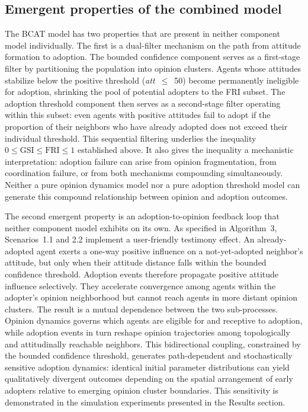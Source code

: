 \documentclass[10pt,letterpaper]{article}
\begin{document}
\subsection*{Emergent properties of the combined model}

The BCAT model has two properties that are present in neither component model individually. The first is a dual-filter mechanism on the path from attitude formation to adoption. The bounded confidence component serves as a first-stage filter by partitioning the population into opinion clusters. Agents whose attitudes stabilize below the positive threshold (\textit{att}~$\leq$~50) become permanently ineligible for adoption, shrinking the pool of potential adopters to the FRI subset. The adoption threshold component then serves as a second-stage filter operating within this subset: even agents with positive attitudes fail to adopt if the proportion of their neighbors who have already adopted does not exceed their individual threshold. This sequential filtering underlies the inequality $0 \leq \text{GSI} \leq \text{FRI} \leq 1$ established above. It also gives the inequality a mechanistic interpretation: adoption failure can arise from opinion fragmentation, from coordination failure, or from both mechanisms compounding simultaneously. Neither a pure opinion dynamics model nor a pure adoption threshold model can generate this compound relationship between opinion and adoption outcomes.

The second emergent property is an adoption-to-opinion feedback loop that neither component model exhibits on its own. As specified in Algorithm~3, Scenarios~1.1 and 2.2 implement a user-friendly testimony effect. An already-adopted agent exerts a one-way positive influence on a not-yet-adopted neighbor's attitude, but only when their attitude distance falls within the bounded confidence threshold. Adoption events therefore propagate positive attitude influence selectively. They accelerate convergence among agents within the adopter's opinion neighborhood but cannot reach agents in more distant opinion clusters. The result is a mutual dependence between the two sub-processes. Opinion dynamics governs which agents are eligible for and receptive to adoption, while adoption events in turn reshape opinion trajectories among topologically and attitudinally reachable neighbors. This bidirectional coupling, constrained by the bounded confidence threshold, generates path-dependent and stochastically sensitive adoption dynamics: identical initial parameter distributions can yield qualitatively divergent outcomes depending on the spatial arrangement of early adopters relative to emerging opinion cluster boundaries. This sensitivity is demonstrated in the simulation experiments presented in the Results section.
\end{document}
